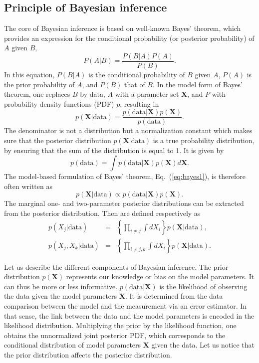 \subsection{Principle of Bayesian inference}\label{subsec:bayes}

The core of Bayesian inference is based on well-known Bayes' theorem, 
which provides an expression for the conditional probability (or posterior
probability) of $A$ given $B$,
%
\begin{equation}
  P(A|B) = \frac{P(B|A)P(A)}{P(B)}.
\end{equation}
%
In this equation, $P(B|A)$ is the conditional probability of $B$ given $A$, 
$P(A)$ is the prior probability of $A$, and $P(B)$ that of $B$.
In the model form of Bayes' theorem, one replaces $B$ by data, $A$ with 
a parameter set $\bm{X}$, and $P$ with probability density functions (PDF) 
$p$, resulting in~\cite{Bayes}
%
\begin{equation}
  p(\bm{X}|\text{data}) = \frac{p(\text{data}|\bm{X})
  p(\bm{X})}{p(\text{data})}.\label{eq:bayes1}
\end{equation}
%
The denominator is not a distribution but a normalization constant which makes 
sure that the posterior distribution $p(\bm{X}|\text{data})$ is a 
true probability distribution, by ensuring that the sum of the distribution is 
equal to 1. It is given by
%
\begin{equation}
  p(\text{data}) = \int p(\text{data}|\bm{X})p(\bm{X})
  d\bm{X}.
\end{equation}
%
The model-based formulation of Bayes' theorem, Eq.~(\ref{eq:bayes1}), is 
therefore often written as
%
\begin{equation}
  p(\bm{X}|\text{data}) \propto p(\text{data}|\bm{X})
  p(\bm{X}).
\end{equation}
%
The marginal one- and two-parameter posterior distributions can be extracted
from the posterior distribution. Then are defined respectively as
%
\begin{eqnarray}
  p(X_j|\text{data}) &=& \left\{\prod_{i \neq j} \int
  dX_i\right\}p(\bm{X}|\text{data}),\label{eq:marg1}\\
  p(X_j,X_k|\text{data}) &=& \left\{\prod_{i \neq j,k} 
    \int dX_i\right\}p(\bm{X}|\text{data}).
\end{eqnarray}
%

Let us describe the different components of Bayesian inference. The 
prior distribution $p(\bm{X})$ represents our knowledge or bias on the 
model parameters. It can thus be more or less informative.
$p(\text{data}|\bm{X})$ is the likelihood of observing the data given the model
parameters $\bm{X}$. It is determined from the data comparison between the 
model and the measurement via an error estimator. In that sense, the link 
between the data and the model parameters is encoded in the likelihood
distribution. 
Multiplying the prior by the likelihood function, one obtains the unnormalized 
joint posterior PDF, which corresponds to the conditional distribution of 
model parameters $\bm{X}$ given the data. Let us notice that the prior 
distribution affects the posterior distribution. 

